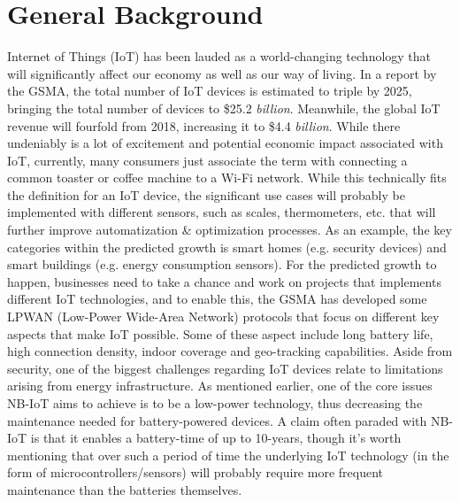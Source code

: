 






\section{General Background}
Internet of Things (IoT) has been lauded as a world-changing technology that will significantly affect our economy as well as our way of living. In a report by the GSMA, the total number of IoT devices is estimated to triple by 2025, bringing the total number of devices to \$25.2 \textit{billion}. Meanwhile, the global IoT revenue will fourfold from 2018, increasing it to \$4.4 \textit{billion}.\cite{gsma-report} While there undeniably is a lot of excitement and potential economic impact associated with IoT, currently, many consumers just associate the term with connecting a common toaster or coffee machine to a Wi-Fi network. While this technically fits the definition for an IoT device\cite{what_is_iot}, the significant use cases will probably be implemented with different sensors, such as scales, thermometers, etc. that will further improve automatization \& optimization processes. As an example, the key categories within the predicted growth is smart homes (e.g. security devices) and smart buildings (e.g. energy consumption sensors).\cite{gsma-report} For the predicted growth to happen, businesses need to take a chance and work on projects that implements different IoT technologies, and to enable this, the GSMA has developed some LPWAN (Low-Power Wide-Area Network) protocols that focus on different key aspects that make IoT possible. Some of these aspect include long battery life, high connection density, indoor coverage and geo-tracking capabilities. Aside from security, one of the biggest challenges regarding IoT devices relate to limitations arising from energy infrastructure. As mentioned earlier, one of the core issues NB-IoT aims to achieve is to be a low-power technology, thus decreasing the maintenance needed for battery-powered devices. A claim often paraded with NB-IoT is that it enables a battery-time of up to 10-years\cite{gsma-nb-iot}, though it's worth mentioning that over such a period of time the underlying IoT technology (in the form of microcontrollers/sensors) will probably require more frequent maintenance than the batteries themselves.


